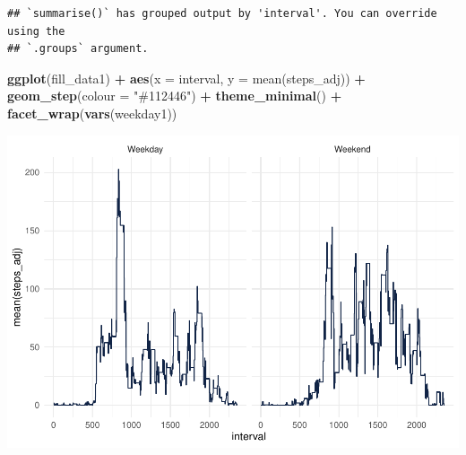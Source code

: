 \documentclass[
]{article}
\newenvironment{Shaded}{\begin{snugshade}}{\end{snugshade}}
\newcommand{\AttributeTok}[1]{\textcolor[rgb]{0.13,0.29,0.53}{#1}}
\newcommand{\FunctionTok}[1]{\textcolor[rgb]{0.13,0.29,0.53}{\textbf{#1}}}
\newcommand{\NormalTok}[1]{#1}
\newcommand{\OtherTok}[1]{\textcolor[rgb]{0.56,0.35,0.01}{#1}}
\newcommand{\SpecialCharTok}[1]{\textcolor[rgb]{0.81,0.36,0.00}{\textbf{#1}}}
\newcommand{\StringTok}[1]{\textcolor[rgb]{0.31,0.60,0.02}{#1}}
\begin{document}
\begin{Shaded}
\end{Shaded}

\begin{verbatim}
## `summarise()` has grouped output by 'interval'. You can override using the
## `.groups` argument.
\end{verbatim}

\begin{Shaded}
\begin{Highlighting}[]
\FunctionTok{ggplot}\NormalTok{(fill\_data1) }\SpecialCharTok{+}
  \FunctionTok{aes}\NormalTok{(}\AttributeTok{x =}\NormalTok{ interval, }\AttributeTok{y =} \StringTok{\textasciigrave{}}\AttributeTok{mean(steps\_adj)}\StringTok{\textasciigrave{}}\NormalTok{) }\SpecialCharTok{+}
  \FunctionTok{geom\_step}\NormalTok{(}\AttributeTok{colour =} \StringTok{"\#112446"}\NormalTok{) }\SpecialCharTok{+}
  \FunctionTok{theme\_minimal}\NormalTok{() }\SpecialCharTok{+}
  \FunctionTok{facet\_wrap}\NormalTok{(}\FunctionTok{vars}\NormalTok{(weekday1))}
\end{Highlighting}
\end{Shaded}

\includegraphics{project1_files/figure-latex/unnamed-chunk-10-1.pdf}
\end{document}
